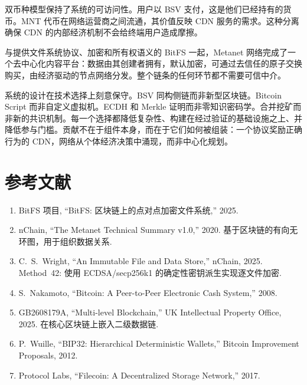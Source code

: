 \documentclass[11pt,a4paper]{article}
\begin{document}
双币种模型保持了系统的可访问性。用户以 BSV 支付，这是他们已经持有的货币。MNT 代币在网络运营商之间流通，其价值反映 CDN 服务的需求。这种分离确保 CDN 的内部经济机制不会给终端用户造成摩擦。

与提供文件系统协议、加密和所有权语义的 BitFS 一起，Metanet 网络完成了一个去中心化内容平台：数据由其创建者拥有，默认加密，可通过去信任的原子交换购买，由经济驱动的节点网络分发。整个链条的任何环节都不需要可信中介。

系统的设计在技术选择上刻意保守。BSV 同构侧链而非新型区块链。Bitcoin Script 而非自定义虚拟机。ECDH 和 Merkle 证明而非零知识密码学。合并挖矿而非新的共识机制。每一个选择都降低复杂性、构建在经过验证的基础设施之上、并降低参与门槛。贡献不在于组件本身，而在于它们如何被组装：一个协议奖励正确行为的 CDN，网络从个体经济决策中涌现，而非中心化规划。

\section*{参考文献}

\begin{enumerate}
\item BitFS 项目, ``BitFS: 区块链上的点对点加密文件系统,'' 2025.

\item nChain, ``The Metanet Technical Summary v1.0,'' 2020. 基于区块链的有向无环图，用于组织数据关系.

\item C.~S.~Wright, ``An Immutable File and Data Store,'' nChain, 2025. Method~42: 使用 ECDSA/secp256k1 的确定性密钥派生实现逐文件加密.

\item S.~Nakamoto, ``Bitcoin: A Peer-to-Peer Electronic Cash System,'' 2008.

\item GB2608179A, ``Multi-level Blockchain,'' UK Intellectual Property Office, 2025. 在核心区块链上嵌入二级数据链.

\item P.~Wuille, ``BIP32: Hierarchical Deterministic Wallets,'' Bitcoin Improvement Proposals, 2012.

\item Protocol Labs, ``Filecoin: A Decentralized Storage Network,'' 2017.
\end{enumerate}
\end{document}
